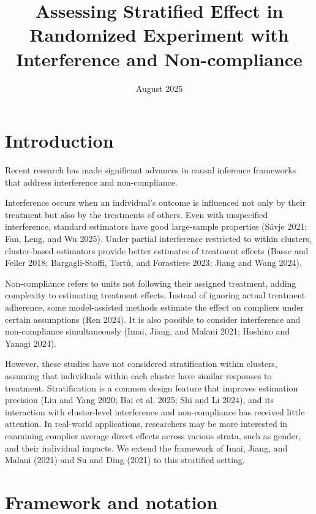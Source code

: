 \documentclass[a4paper, 12pt]{article}
\title{Assessing Stratified Effect in Randomized Experiment with Interference and Non-compliance}
\author{}
\date{August 2025}
\begin{document}
\maketitle

\section{Introduction}

Recent research has made significant advances in causal inference frameworks that address interference and non-compliance. 

Interference occurs when an individual's outcome is influenced not only by their treatment but also by the treatments of others. Even with unspecified interference, standard estimators have good large-sample properties (Sävje 2021; Fan, Leng, and Wu 2025). Under partial interference restricted to within clusters, cluster-based estimators provide better estimates of treatment effects (Basse and Feller 2018; Bargagli-Stoffi, Tortù, and Forastiere 2023; Jiang and Wang 2024).

Non-compliance refers to units not following their assigned treatment, adding complexity to estimating treatment effects. Instead of ignoring actual treatment adherence, some model-assisted methods estimate the effect on compliers under certain assumptions (Ren 2024). It is also possible to consider interference and non-compliance simultaneously (Imai, Jiang, and Malani 2021; Hoshino and Yanagi 2024).

However, these studies have not considered stratification within clusters, assuming that individuals within each cluster have similar responses to treatment. Stratification is a common design feature that improves estimation precision (Liu and Yang 2020; Bai et al. 2025; Shi and Li 2024), and its interaction with cluster-level interference and non-compliance has received little attention. In real-world applications, researchers may be more interested in examining complier average direct effects across various strata, such as gender, and their individual impacts. We extend the framework of Imai, Jiang, and Malani (2021) and Su and Ding (2021) to this stratified setting.

\section{Framework and notation}  %
\end{document}
